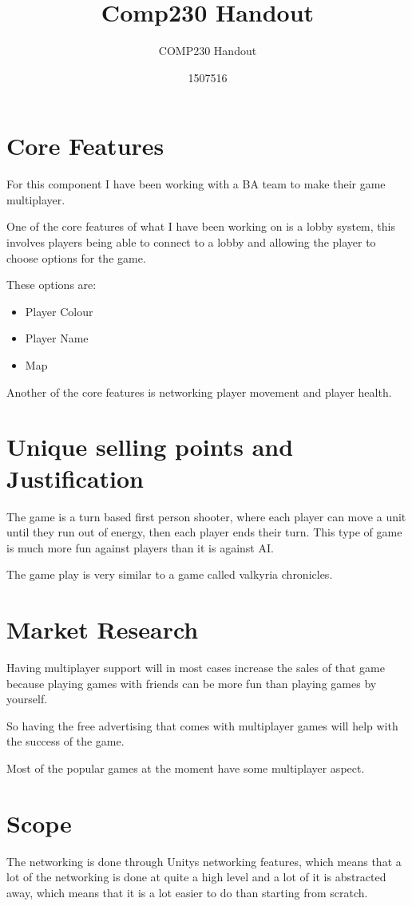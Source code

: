 \documentclass{scrartcl}
\title{Comp230 Handout}
\subtitle{COMP230 Handout}
\author{1507516}
\begin{document}
\maketitle

\abstract{}


\section{Core Features}
For this component I have been working with a BA team to make their game multiplayer.

One of the core features of what I have been working on is a lobby system, this involves players being able to connect to a lobby and allowing the player to choose options for the game.

These options are:

\begin{itemize}
\item Player Colour
\item Player Name
\item Map
\end{itemize}

Another of the core features is networking player movement and player health.

\section{Unique selling points and Justification}
The game is a turn based first person shooter, where each player can move a unit until they run out of energy, then each player ends their turn. 
This type of game is much more fun against players than it is against AI. 

The game play is very similar to a game called valkyria chronicles.

\section{Market Research}

Having  multiplayer support will in most cases increase the sales of that game because playing games with friends can be more fun than playing games by yourself.

So having the free advertising that comes with multiplayer games will help with the success of the game.

Most of the popular games at the moment have some multiplayer aspect.

\section{Scope}
The networking is done through Unitys networking features, which means that a lot of the networking is done at quite a high level and a lot of it is abstracted away, which means that it is a lot easier to do than starting from scratch. 
\end{document}

